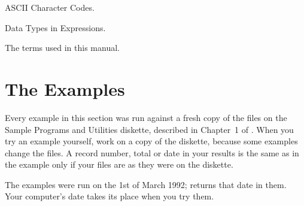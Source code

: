 ASCII Character Codes.

Data Types in Expressions.

The terms used in this manual.

\section{The Examples}
Every example in this section was run against a fresh copy of the files on the
Sample Programs and Utilities diskette, described in Chapter~1 of
.  When you try an example yourself, work on a copy
of the diskette, because some examples change the files.  A record number,
total or date in your results is the same as in the example only if your files
are as they were on the diskette.

The examples were run on the 1st of March 1992;  returns that
date in them.  Your computer's date takes its place when you try them.
